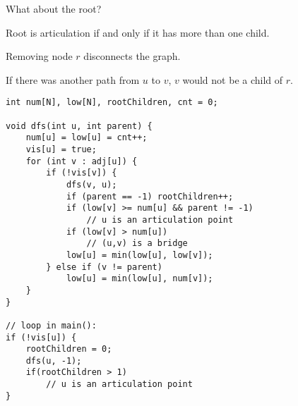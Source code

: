 \documentclass[10pt]{beamer}
\begin{document}
\begin{frame}

What about the root? \pause 

\vspace{0.5cm}

Root is articulation if and only if it has more than one child.

\vspace{0.5cm}

\begin{center}
\end{center}

\vspace{0.5cm}

Removing node $r$ disconnects the graph.

\vspace{0.5cm}

If there was another path from $u$ to $v$, $v$ would not be a child of $r$.

\end{frame}


\begin{frame}[fragile]

\begin{lstlisting}
int num[N], low[N], rootChildren, cnt = 0;

void dfs(int u, int parent) {
    num[u] = low[u] = cnt++;
    vis[u] = true;
    for (int v : adj[u]) {
        if (!vis[v]) {
            dfs(v, u);
            if (parent == -1) rootChildren++;
            if (low[v] >= num[u] && parent != -1)
                // u is an articulation point
            if (low[v] > num[u])
                // (u,v) is a bridge
            low[u] = min(low[u], low[v]);
        } else if (v != parent)
            low[u] = min(low[u], num[v]);
    }
}

// loop in main():
if (!vis[u]) {
    rootChildren = 0;
    dfs(u, -1);
    if(rootChildren > 1)
        // u is an articulation point
}
\end{lstlisting}

\end{frame}
\end{document}
